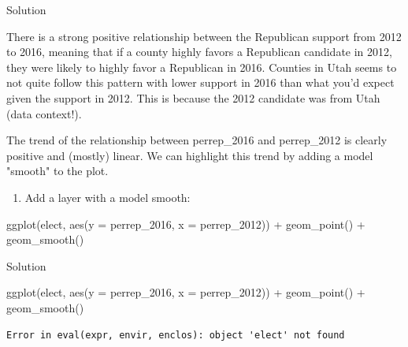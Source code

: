 \documentclass[
  letterpaper,
  DIV=11,
  numbers=noendperiod]{scrreprt}
\newenvironment{Shaded}{\begin{snugshade}}{\end{snugshade}}
\newcommand{\AttributeTok}[1]{\textcolor[rgb]{0.40,0.45,0.13}{#1}}
\newcommand{\FunctionTok}[1]{\textcolor[rgb]{0.28,0.35,0.67}{#1}}
\newcommand{\NormalTok}[1]{\textcolor[rgb]{0.00,0.23,0.31}{#1}}
\newcommand{\SpecialCharTok}[1]{\textcolor[rgb]{0.37,0.37,0.37}{#1}}
\providecommand{\tightlist}{%
  \setlength{\itemsep}{0pt}\setlength{\parskip}{0pt}}\usepackage{longtable,booktabs,array}
\begin{document}
Solution

There is a strong positive relationship between the Republican support
from 2012 to 2016, meaning that if a county highly favors a Republican
candidate in 2012, they were likely to highly favor a Republican in
2016. Counties in Utah seems to not quite follow this pattern with lower
support in 2016 than what you'd expect given the support in 2012. This
is because the 2012 candidate was from Utah (data context!).

\hfill\break

\begin{Shaded}
\begin{Highlighting}[]
\NormalTok{The trend of the relationship between \textasciigrave{}perrep\_2016\textasciigrave{} and \textasciigrave{}perrep\_2012\textasciigrave{} is clearly positive and (mostly) linear.  We can highlight this trend by adding a model "smooth" to the plot.    }
\end{Highlighting}
\end{Shaded}

\begin{enumerate}
\def\labelenumi{\alph{enumi}.}
\tightlist
\item
  Add a layer with a model smooth:
\end{enumerate}

\begin{Shaded}
\begin{Highlighting}[]
\FunctionTok{ggplot}\NormalTok{(elect, }\FunctionTok{aes}\NormalTok{(}\AttributeTok{y =}\NormalTok{ perrep\_2016, }\AttributeTok{x =}\NormalTok{ perrep\_2012)) }\SpecialCharTok{+}
  \FunctionTok{geom\_point}\NormalTok{() }\SpecialCharTok{+}
  \FunctionTok{geom\_smooth}\NormalTok{()}
\end{Highlighting}
\end{Shaded}

Solution

\begin{Shaded}
\begin{Highlighting}[]
\FunctionTok{ggplot}\NormalTok{(elect, }\FunctionTok{aes}\NormalTok{(}\AttributeTok{y =}\NormalTok{ perrep\_2016, }\AttributeTok{x =}\NormalTok{ perrep\_2012)) }\SpecialCharTok{+}
  \FunctionTok{geom\_point}\NormalTok{() }\SpecialCharTok{+}
  \FunctionTok{geom\_smooth}\NormalTok{()}
\end{Highlighting}
\end{Shaded}

\begin{verbatim}
Error in eval(expr, envir, enclos): object 'elect' not found
\end{verbatim}
\end{document}
